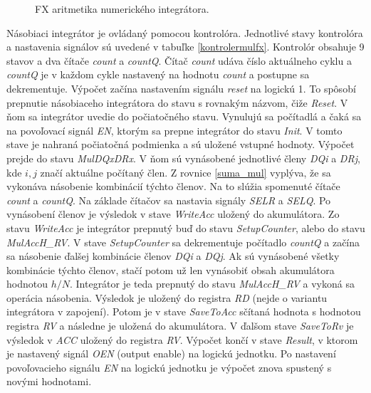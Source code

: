 \bigskip
\begin{figure}[h]
\centering
{}
\caption{FX aritmetika numerického integrátora.}
\label{fxmularitmetic}
\end{figure}
\bigskip

Násobiaci integrátor je ovládaný pomocou kontrolóra. Jednotlivé stavy kontrolóra a nastavenia signálov sú uvedené v tabuľke \ref{kontrolermulfx}. Kontrolór obsahuje 9 stavov a dva čítače \textit{count} a \textit{countQ}. Čítač \textit{count} udáva číslo aktuálneho cyklu a \textit{countQ} je v každom cykle nastavený na hodnotu \textit{count} a postupne sa dekrementuje. Výpočet začína nastavením signálu \textit{reset} na logickú 1. To spôsobí prepnutie násobiaceho integrátora do stavu s rovnakým názvom, čiže \textit{Reset}. V ňom sa integrátor uvedie do počiatočného stavu. Vynulujú sa počítadlá a čaká sa na povoľovací signál \textit{EN}, ktorým sa prepne integrátor do stavu \textit{Init}. V tomto stave je nahraná počiatočná podmienka a sú uložené vstupné hodnoty. Výpočet prejde do stavu \textit{MulDQxDRx}. V ňom sú vynásobené jednotlivé členy \textit{DQi} a \textit{DRj}, kde $ i, j $ značí aktuálne počítaný člen. Z rovnice \eqref{suma_mul} vyplýva, že sa vykonáva násobenie kombinácií týchto členov. Na to slúžia spomenuté čítače \textit{count} a \textit{countQ}. Na základe čítačov sa nastavia signály \textit{SELR} a \textit{SELQ}. Po vynásobení členov je výsledok v stave \textit{WriteAcc} uložený do akumulátora. Zo stavu \textit{WriteAcc} je integrátor prepnutý buď do stavu \textit{SetupCounter}, alebo do stavu \textit{MulAccH\_RV}. V stave \textit{SetupCounter} sa dekrementuje počítadlo \textit{countQ} a začína sa násobenie ďalšej kombinácie členov \textit{DQi} a \textit{DQj}. Ak sú vynásobené všetky kombinácie týchto členov, stačí potom už len vynásobiť obsah akumulátora hodnotou $ h/N $. Integrátor je teda prepnutý do stavu \textit{MulAccH\_RV} a vykoná sa operácia násobenia. Výsledok je uložený do registra \textit{RD} (nejde o variantu  integrátora v zapojení). Potom je v stave \textit{SaveToAcc} sčítaná hodnota s hodnotou registra \textit{RV} a následne je uložená do akumulátora. V ďalšom stave \textit{SaveToRv} je výsledok v \textit{ACC} uložený do registra \textit{RV}. Výpočet končí v stave \textit{Result}, v ktorom je nastavený signál \textit{OEN} (output enable) na logickú jednotku. Po nastavení povoľovacieho signálu \textit{EN} na logickú jednotku je výpočet znova spustený s novými hodnotami.

